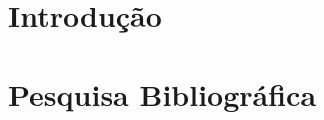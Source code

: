 

\listoffigures*
\cleardoublepage

\listoftables*
\cleardoublepage



\tableofcontents*
\etocsettocstyle{}{} 
\cleardoublepage

\textual

\chapter[Introdução]{Introdução}\label{cap:intro}



\chapter{Pesquisa Bibliográfica}\label{cap:pesquisa}

\minitoc



